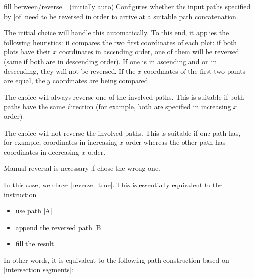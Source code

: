 \begin{tikzkey}{fill between/reverse= (initially auto)}
    Configures whether the input paths specified by |of| need to be reversed in
    order to arrive at a suitable path concatenation.

    The initial choice  will handle this automatically. To
    this end, it applies the following heuristics: it compares the two first
    coordinates of each plot: if both plots have their $x$ coordinates in
    ascending order, one of them will be reversed (same if both are in
    descending order). If one is in ascending and on in descending, they will
    not be reversed. If the $x$ coordinates of the first two points are equal,
    the $y$ coordinates are being compared.

    The choice  will always reverse one of the involved
    paths. This is suitable if both paths have the same direction (for example,
    both are specified in increasing $x$ order).

    The choice  will not reverse the involved paths. This is
    suitable if one path has, for example, coordinates in increasing $x$ order
    whereas the other path has coordinates in decreasing $x$ order.

    Manual reversal is necessary if \PGFPlots{} chose the wrong one.
\begin{codeexample}[]
\end{codeexample}
    In this case, we chose |reverse=true|. This is essentially equivalent to
    the instruction
    \begin{itemize}
        \item use path |A|
        \item append the reversed path |B|
        \item fill the result.
    \end{itemize}
    In other words, it is equivalent to the following path construction based
    on |intersection segments|:
\begin{codeexample}[]
\end{codeexample}
\end{tikzkey}
